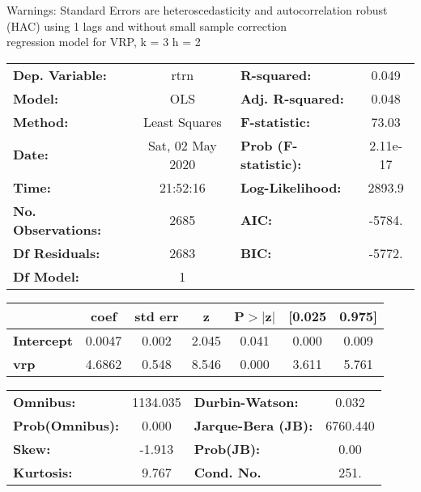 Warnings: \newline
 [1] Standard Errors are heteroscedasticity and autocorrelation robust (HAC) using 1 lags and without small sample correction\\ 

regression model for VRP, k = 3 h = 2\begin{center}
\begin{tabular}{lclc}
\toprule
\textbf{Dep. Variable:}    &       rtrn       & \textbf{  R-squared:         } &     0.049   \\
\textbf{Model:}            &       OLS        & \textbf{  Adj. R-squared:    } &     0.048   \\
\textbf{Method:}           &  Least Squares   & \textbf{  F-statistic:       } &     73.03   \\
\textbf{Date:}             & Sat, 02 May 2020 & \textbf{  Prob (F-statistic):} &  2.11e-17   \\
\textbf{Time:}             &     21:52:16     & \textbf{  Log-Likelihood:    } &    2893.9   \\
\textbf{No. Observations:} &        2685      & \textbf{  AIC:               } &    -5784.   \\
\textbf{Df Residuals:}     &        2683      & \textbf{  BIC:               } &    -5772.   \\
\textbf{Df Model:}         &           1      & \textbf{                     } &             \\
\bottomrule
\end{tabular}
\begin{tabular}{lcccccc}
                   & \textbf{coef} & \textbf{std err} & \textbf{z} & \textbf{P$> |$z$|$} & \textbf{[0.025} & \textbf{0.975]}  \\
\midrule
\textbf{Intercept} &       0.0047  &        0.002     &     2.045  &         0.041        &        0.000    &        0.009     \\
\textbf{vrp}       &       4.6862  &        0.548     &     8.546  &         0.000        &        3.611    &        5.761     \\
\bottomrule
\end{tabular}
\begin{tabular}{lclc}
\textbf{Omnibus:}       & 1134.035 & \textbf{  Durbin-Watson:     } &    0.032  \\
\textbf{Prob(Omnibus):} &   0.000  & \textbf{  Jarque-Bera (JB):  } & 6760.440  \\
\textbf{Skew:}          &  -1.913  & \textbf{  Prob(JB):          } &     0.00  \\
\textbf{Kurtosis:}      &   9.767  & \textbf{  Cond. No.          } &     251.  \\
\bottomrule
\end{tabular}
\end{center}

